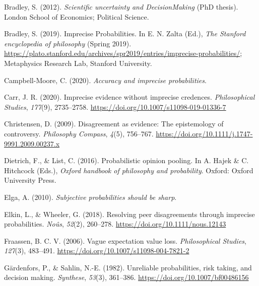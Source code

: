 \documentclass[
  10pt,
  dvipsnames,enabledeprecatedfontcommands]{scrartcl}
\newlength{\cslhangindent}
\newlength{\cslentryspacingunit} %
\newenvironment{CSLReferences}[2] %
 {%
  \setlength{\parindent}{0pt}
  \ifodd #1
  \let\oldpar\par
  \def\par{\hangindent=\cslhangindent\oldpar}
  \fi
  \setlength{\parskip}{#2\cslentryspacingunit}
 }%
 {}
\begin{document}
\hypertarget{refs}{}
\begin{CSLReferences}{1}{0}
\leavevmode{}%
Bradley, S. (2012). \emph{Scientific uncertainty and DecisionMaking}
(PhD thesis). London School of Economics; Political Science.

\leavevmode{}%
Bradley, S. (2019). {Imprecise Probabilities}. In E. N. Zalta (Ed.),
\emph{The {Stanford} encyclopedia of philosophy} ({S}pring 2019).
\url{https://plato.stanford.edu/archives/spr2019/entries/imprecise-probabilities/};
Metaphysics Research Lab, Stanford University.

\leavevmode{}%
Campbell-Moore, C. (2020). \emph{Accuracy and imprecise probabilities}.

\leavevmode{}%
Carr, J. R. (2020). Imprecise evidence without imprecise credences.
\emph{Philosophical Studies}, \emph{177}(9), 2735--2758.
\url{https://doi.org/10.1007/s11098-019-01336-7}

\leavevmode{}%
Christensen, D. (2009). Disagreement as evidence: The epistemology of
controversy. \emph{Philosophy Compass}, \emph{4}(5), 756--767.
\url{https://doi.org/10.1111/j.1747-9991.2009.00237.x}

\leavevmode{}%
Dietrich, F., \& List, C. (2016). Probabilistic opinion pooling. In A.
Hajek \& C. Hitchcock (Eds.), \emph{Oxford handbook of philosophy and
probability}. Oxford: Oxford University Press.

\leavevmode{}%
Elga, A. (2010). \emph{Subjective probabilities should be sharp}.

\leavevmode{}%
Elkin, L., \& Wheeler, G. (2018). Resolving peer disagreements through
imprecise probabilities. \emph{Noûs}, \emph{52}(2), 260--278.
\url{https://doi.org/10.1111/nous.12143}

\leavevmode{}%
Fraassen, B. C. V. (2006). Vague expectation value loss.
\emph{Philosophical Studies}, \emph{127}(3), 483--491.
\url{https://doi.org/10.1007/s11098-004-7821-2}

\leavevmode{}%
Gärdenfors, P., \& Sahlin, N.-E. (1982). Unreliable probabilities, risk
taking, and decision making. \emph{Synthese}, \emph{53}(3), 361--386.
\url{https://doi.org/10.1007/bf00486156}


\end{CSLReferences}
\end{document}
